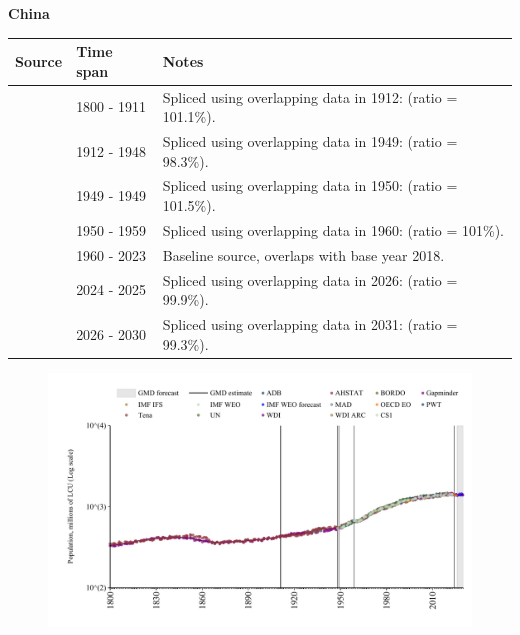 \documentclass[12pt,a4paper,landscape]{article}
\begin{document}
\begin{adjustbox}{max totalsize={\paperwidth}{\paperheight},center}
\begin{minipage}[t][\textheight][t]{\textwidth}
\vspace*{0.5cm}
{}
\begin{center}
{\Large\bfseries China}
\end{center}
\vspace{0.5cm}
\begin{table}[H]
\centering
\small
\begin{tabular}{|l|l|l|}
\hline
\textbf{Source} & \textbf{Time span} & \textbf{Notes} \\
\hline
\rowcolor{white}\cite{Gapminder}& 1800 - 1911 &Spliced using overlapping data in 1912: (ratio = 101.1\%).\\
\rowcolor{lightgray}\cite{AHSTAT}& 1912 - 1948 &Spliced using overlapping data in 1949: (ratio = 98.3\%).\\
\rowcolor{white}\cite{CS1_CHN}& 1949 - 1949 &Spliced using overlapping data in 1950: (ratio = 101.5\%).\\
\rowcolor{lightgray}\cite{IMF_IFS}& 1950 - 1959 &Spliced using overlapping data in 1960: (ratio = 101\%).\\
\rowcolor{white}\cite{WDI}& 1960 - 2023 &Baseline source, overlaps with base year 2018.\\
\rowcolor{lightgray}\cite{OECD_EO}& 2024 - 2025 &Spliced using overlapping data in 2026: (ratio = 99.9\%).\\
\rowcolor{white}\cite{Gapminder}& 2026 - 2030 &Spliced using overlapping data in 2031: (ratio = 99.3\%).\\
\hline
\end{tabular}
\end{table}
\begin{figure}[H]
\centering
\includegraphics[width=\textwidth,height=0.6\textheight,keepaspectratio]{graphs/CHN_pop.pdf}
\end{figure}
\end{minipage}
\end{adjustbox}
\end{document}

